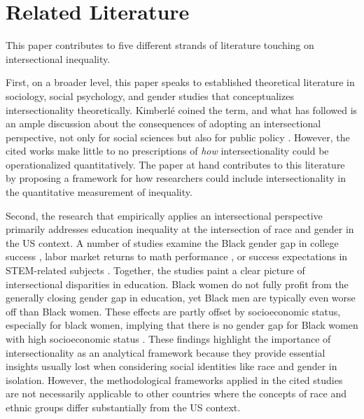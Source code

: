 \section{Related Literature}\label{sec:literature}

This paper contributes to five different strands of literature touching on intersectional inequality. 

First, on a broader level, this paper speaks to established theoretical literature in sociology, social psychology, and gender studies that conceptualizes intersectionality theoretically. Kimberlé \cite{crenshaw1989} coined the term, and what has followed is an ample discussion about the consequences of adopting an intersectional perspective, not only for social sciences but also for public policy \citep[to name just a few examples:][]{alexander-floyd2012, berger2010, bowleg2008, cho2013, choo2010, few-demo2014, hancock2007, shields2008, strid2013, walby2012}. However, the cited works make little to no prescriptions of \textit{how} intersectionality could be operationalized quantitatively. The paper at hand contributes to this literature by proposing a framework for how researchers could include intersectionality in the quantitative measurement of inequality.

Second, the research that empirically applies an intersectional perspective primarily addresses education inequality at the intersection of race and gender in the US context. A number of studies examine the Black gender gap in college success \citep{Keels2013, McDaniel2011, Mittleman2021}, labor market returns to math performance \citep{Riegle-Crumb2006}, or success expectations in STEM-related subjects \citep[][review article]{Parker2020}. Together, the studies paint a clear picture of intersectional disparities in education. Black women do not fully profit from the generally closing gender gap in education, yet Black men are typically even worse off than Black women. These effects are partly offset by socioeconomic status, especially for black women, implying that there is no gender gap for Black women with high socioeconomic status \citep{Keels2013}. These findings highlight the importance of intersectionality as an analytical framework because they provide essential insights usually lost when considering social identities like race and gender in isolation. However, the methodological frameworks applied in the cited studies are not necessarily applicable to other countries where the concepts of race and ethnic groups differ substantially from the US context.

